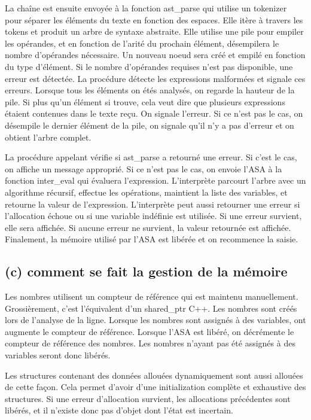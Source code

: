 \documentclass[a4paper,12pt]{article}
\begin{document}
	La chaîne est ensuite envoyée à la fonction ast\_parse qui utilise un tokenizer pour séparer
	les éléments du texte en fonction des espaces. Elle itère à travers les tokens et produit un
	arbre de syntaxe abstraite. Elle utilise une pile pour empiler les opérandes, et en fonction
	de l'arité du prochain élément, désempilera le nombre d'opérandes nécessaire. Un nouveau
	noeud sera créé et empilé en fonction du type d'élément. Si le nombre d'opérandes requises
	n'est pas disponible, une erreur est détectée. La procédure détecte les expressions malformées
	et signale ces erreurs. Lorsque tous les éléments on étés analysés, on regarde la hauteur de
	la pile. Si plus qu'un élément si trouve, cela veut dire que plusieurs expressions étaient
	contenues dans le texte reçu. On signale l'erreur. Si ce n'est pas le cas, on désempile le dernier
	élément de la pile, on signale qu'il n'y a pas d'erreur et on obtient l'arbre complet.

	La procédure appelant vérifie si ast\_parse a retourné une erreur. Si c'est le cas, on affiche
	un message approprié. Si ce n'est pas le cas, on envoie l'ASA à la fonction inter\_eval qui évaluera
	l'expression. L'interprète parcourt l'arbre avec un algorithme récursif, effectue les opérations,
	maintient la liste des variables, et retourne la valeur de l'expression. L'interprète peut aussi
	retourner une erreur si l'allocation échoue ou si une variable indéfinie est utilisée. Si une erreur
	survient, elle sera affichée. Si aucune erreur ne survient, la valeur retournée est affichée.
	Finalement, la mémoire utilisé par l'ASA est libérée et on recommence la saisie.

	\subsection{(c) comment se fait la gestion de la mémoire}
	Les nombres utilisent un compteur de référence qui est maintenu manuellement. Grossièrement,
	c'est l'équivalent d'un shared\_ptr C++. Les nombres sont créés lors de l'analyse de la
	ligne. Lorsque les nombres sont assignés à des variables, ont augmente le compteur de
	référence. Lorsque l'ASA est libéré, on décrémente le compteur de référence des nombres.
	Les nombres n'ayant pas été assignés à des variables seront donc libérés.

	Les structures contenant des données allouées dynamiquement sont aussi allouées de cette
	façon. Cela permet d'avoir d'une initialization complète et exhaustive des structures.
	Si une erreur d'allocation survient, les allocations précédentes sont libérés, et il
	n'existe donc pas d'objet dont l'état est incertain.
\end{document}
